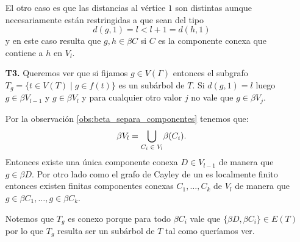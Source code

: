 \documentclass[tesis.tex]{subfiles}
\begin{document}
\begin{deff}
\begin{enumerate}
		El otro caso es que las distancias al vértice $1$ son distintas aunque necesariamente están restringidas a que sean del tipo
		\[
			d(g,1)= l < l+1 = d(h,1)
		\] 
		y en este caso resulta que $g,h \in \beta C$ si $C$ es la componente conexa que contiene a $h$ en $V_l$.
		
		\item[\textbf{T3.}] Queremos ver que si fijamos $g \in V(\Gamma)$ entonces el subgrafo $T_{g} = \{ t \in V(T) \mid g \in f(t) \} $ es un subárbol de $T$.
		Si $d(g,1) = l$ luego $g \in \beta V_{l-1}$ y $g \in \beta V_{l}$ y para cualquier otro valor $j$ no vale que $g \in \beta V_{j}$.
		
		Por la observación \ref{obs:beta_separa_componentes} tenemos que:
		\[
			\beta V_{l} = \underset{\text{\scriptsize $C_{i} \in V_{l}$}}{\bigcup} \beta(C_{i}).
		\]
		Entonces existe una única componente conexa $D \in V_{l-1}$ de manera que $g \in \beta D$. 
		Por otro lado como el grafo de Cayley de un \fg es localmente finito entonces existen finitas componentes conexas $C_{1}, \dots, C_{k}$ de $V_{l}$ de manera que $g \in \beta C_{1}, \dots, g \in \beta C_{k}$.

		Notemos que $T_{g}$ es conexo porque para todo $\beta C_{i}$ vale que $\{ \beta D, \beta C_{i} \} \in E(T)$ por lo que $T_{g}$ resulta ser un subárbol de $T$ tal como queríamos ver.
		 
	\end{enumerate}
\end{deff}
\end{document}
